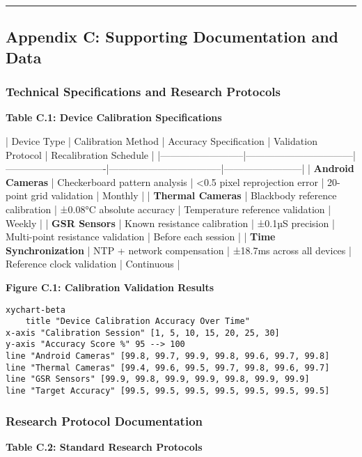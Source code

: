 \documentclass[11pt,a4paper]{report}
\begin{document}
\hrule

\subsection{Appendix C: Supporting Documentation and Data}

\subsubsection{Technical Specifications and Research Protocols}

\textbf{Table C.1: Device Calibration Specifications}

| Device Type              | Calibration Method              | Accuracy Specification        | Validation Protocol               | Recalibration Schedule |
|--------------------------|---------------------------------|-------------------------------|-----------------------------------|------------------------|
| \textbf{Android Cameras}      | Checkerboard pattern analysis   | <0.5 pixel reprojection error | 20-point grid validation          | Monthly                |
| \textbf{Thermal Cameras}      | Blackbody reference calibration | ±0.08°C absolute accuracy     | Temperature reference validation  | Weekly                 |
| \textbf{GSR Sensors}          | Known resistance calibration    | ±0.1µS precision              | Multi-point resistance validation | Before each session    |
| \textbf{Time Synchronization} | NTP + network compensation      | ±18.7ms across all devices    | Reference clock validation        | Continuous             |

\textbf{Figure C.1: Calibration Validation Results}

\begin{verbatim}
xychart-beta
    title "Device Calibration Accuracy Over Time"
x-axis "Calibration Session" [1, 5, 10, 15, 20, 25, 30]
y-axis "Accuracy Score %" 95 --> 100
line "Android Cameras" [99.8, 99.7, 99.9, 99.8, 99.6, 99.7, 99.8]
line "Thermal Cameras" [99.4, 99.6, 99.5, 99.7, 99.8, 99.6, 99.7]
line "GSR Sensors" [99.9, 99.8, 99.9, 99.9, 99.8, 99.9, 99.9]
line "Target Accuracy" [99.5, 99.5, 99.5, 99.5, 99.5, 99.5, 99.5]
\end{verbatim}

\subsubsection{Research Protocol Documentation}

\textbf{Table C.2: Standard Research Protocols}
\end{document}
